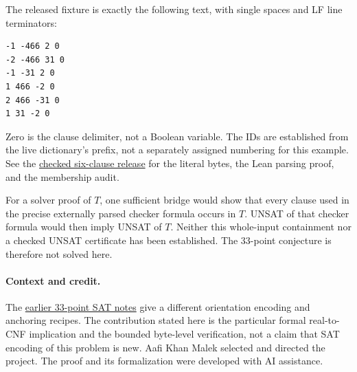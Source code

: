 \documentclass[11pt,letterpaper]{article}
\begin{document}
The released fixture is exactly the following text, with single spaces
and LF line terminators:
\begin{verbatim}
-1 -466 2 0
-2 -466 31 0
-1 -31 2 0
1 466 -2 0
2 466 -31 0
1 31 -2 0
\end{verbatim}
Zero is the clause delimiter, not a Boolean variable. The IDs are
established from the live dictionary's prefix, not a separately assigned
numbering for this example. See the \href{https://github.com/Aafimalek/novel-discoveries/tree/9f014516761d46f011b85037eab5d5bcac3ba585/erdos-szekeres-33/verification/lean-exact-external-six-clause-pilot}{checked six-clause release}
for the literal bytes, the Lean parsing proof, and the membership audit.

For a solver proof of \(T\), one sufficient bridge would show that every
clause used in the precise externally parsed checker formula occurs in
\(T\). UNSAT of that checker formula would then imply UNSAT of \(T\).
Neither this whole-input containment nor a checked UNSAT certificate has
been established. The 33-point conjecture is therefore not solved here.

\paragraph{Context and credit.}
The \href{https://arxiv.org/abs/2512.24061}{earlier 33-point SAT notes}
give a different orientation encoding and anchoring recipes. The
contribution stated here is the particular formal real-to-CNF implication
and the bounded byte-level verification, not a claim that SAT encoding of
this problem is new. Aafi Khan Malek selected and directed the project.
The proof and its formalization were developed with AI assistance.
\end{document}
